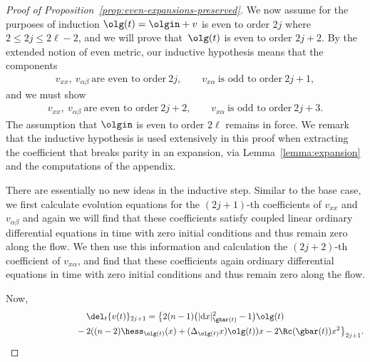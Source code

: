 \begin{proof}[Proof of Proposition~\ref{prop:even-expansions-preserved}]
We now assume for the purposes of induction $\olg(t) = \olgin + v$ is even to order $2j$ where $2 \leq 2j \leq 2\ell -2$, and we will prove that~$\olg(t)$ is even to order $2j+2$. By the extended notion of even metric, our inductive hypothesis means that the components
\begin{gather*}
 v_{xx}, \ v_{\alpha \beta}\ \mbox{are even to order} \ 2j, \qquad
 v_{x\alpha} \ \mbox{is odd to order} \ 2j+1,
\end{gather*}
and we must show
\begin{gather*}
v_{xx}, \ v_{\alpha \beta} \ \mbox{are even to order} \ 2j+2, \qquad
v_{x\alpha} \ \mbox{is odd to order} \ 2j+3.
\end{gather*}
The assumption that $\olgin$ is even to order $2\ell$ remains in force. We remark that the inductive hypothesis is used extensively in this proof when extracting the coefficient that breaks parity in an expansion, via Lemma~\ref{lemma:expansion} and the computations of the appendix.

There are essentially no new ideas in the inductive step. Similar to the base case, we first calculate evolution equations for the $(2j+1)$-th coefficients of $v_{xx}$ and $v_{\alpha \beta}$ and again we will find that these coefficients satisfy coupled linear ordinary differential equations in time with zero initial conditions and thus remain zero along the flow. We then use this information and calculation the $(2j+2)$-th coefficient of $v_{x\alpha}$, and find that these coefficients again ordinary differential equations in time with zero initial conditions and thus remain zero along the flow.

Now,
\begin{gather*}
 \del_t \{ v(t) \}_{2j+1} =\big\{ 2 (n-1) \big(|{\rm d}x|^2_{\gbar(t)} -1\big) \olg(t) \\
 \hphantom{\del_t \{ v(t) \}_{2j+1} =}{} -2 ( (n-2) \hess_{\olg(t)} (x) + (\Delta_{\olg(t)} x) \olg(t) ) x -2 \Rc(\gbar(t)) x^2 \big\}_{2j+1}.
\end{gather*}


\end{proof}
